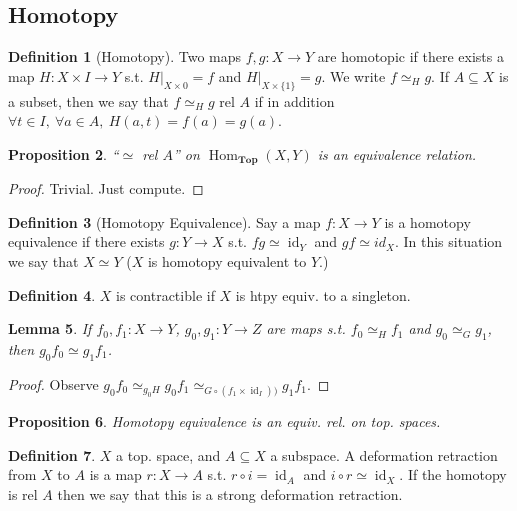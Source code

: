 \documentclass{article}
\theoremstyle{definition}
\newtheorem{defn}{Definition}[section]
\theoremstyle{remark}
\theoremstyle{plain}
\newtheorem{lem}[defn]{Lemma}
\newtheorem{prop}[defn]{Proposition}
\newcommand{\id}{\operatorname{id}}
\newcommand{\Hom}{\operatorname{Hom}}
\begin{document}
\subsection{Homotopy}
\begin{defn}[Homotopy]
    Two maps $f,g:X\to Y$ are homotopic if there exists a map $H:X\times I\to Y$ s.t. $H|_{X\times{0}}=f$ and $H|_{X\times\{1\}}=g$. We write $f\simeq_H g$. If $A\subseteq X$ is a subset, then we say that $f\simeq_H g$ rel $A$ if in addition $\forall t\in I,\ \forall a\in A,\ H(a,t)=f(a)=g(a)$.
\end{defn}
\begin{prop}
    ``$\simeq$ rel $A$'' on $\Hom_{\mathbf{Top}}(X,Y)$ is an equivalence relation.
\end{prop}
\begin{proof}
    Trivial. Just compute.
\end{proof}
\begin{defn}[Homotopy Equivalence]
    Say a map $f:X\to Y$ is a homotopy equivalence if there exists $g:Y\to X$ s.t. $fg\simeq \id_Y$ and $gf\simeq id_X$. In this situation we say that $X\simeq Y$ ($X$ is homotopy equivalent to $Y$.)
\end{defn}
\begin{defn}
    $X$ is contractible if $X$ is htpy equiv. to a singleton.
\end{defn}
\begin{lem}
    If $f_0,f_1:X\to Y$, $g_0,g_1:Y\to Z$ are maps s.t. $f_0\simeq_H f_1$ and $g_0\simeq_G g_1$, then $g_0f_0\simeq g_1f_1$.
\end{lem}
\begin{proof}
    Observe $g_0f_0\simeq_{g_0H}g_0f_1\simeq_{G\circ(f_1\times\id_I))}g_1f_1$.
\end{proof}
\begin{prop}
    Homotopy equivalence is an equiv. rel. on top. spaces.
\end{prop}
\begin{defn}
    $X$ a top. space, and $A\subseteq X$ a subspace. A deformation retraction from $X$ to $A$ is a map $r:X\to A$ s.t. $r\circ i=\id_A$ and $i\circ r\simeq \id_X$. If the homotopy is rel $A$ then we say that this is a strong deformation retraction.
\end{defn}
\end{document}
